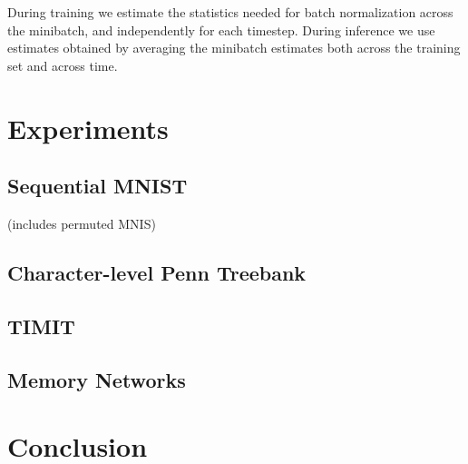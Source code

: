 \documentclass{article} %
\begin{document}
During training we estimate the statistics needed for batch normalization across the minibatch, and independently for each timestep.
During inference we use estimates obtained by averaging the minibatch estimates both across the training set and across time.

\section{Experiments}

\subsection{Sequential MNIST}
(includes permuted MNIS)

\subsection{Character-level Penn Treebank}

\subsection{TIMIT}

\subsection{Memory Networks}

\section{Conclusion}
\end{document}
